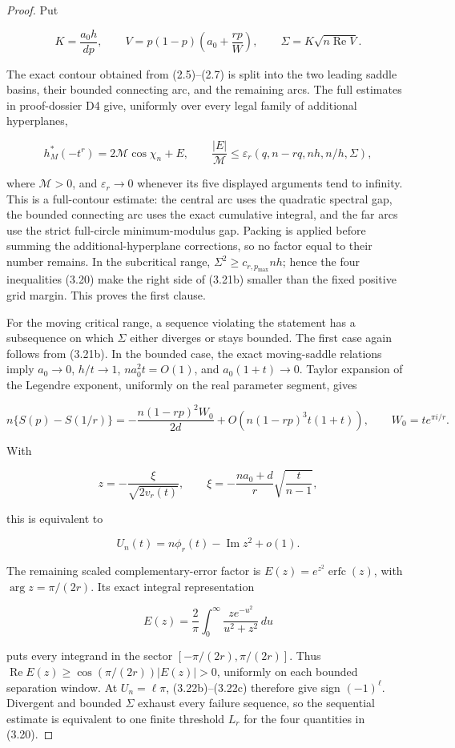 \documentclass[10pt]{article}
\begin{document}
\begin{proof}


Put

\[
 K=\frac{a_0h}{dp},\qquad
 V=p(1-p)\left(a_0+\frac{rp}{W}\right),
 \qquad \Sigma=K\sqrt{n\operatorname{Re}V}. \tag{3.21a}
\]

The exact contour obtained from (2.5)--(2.7) is split into the two leading
saddle basins, their bounded connecting arc, and the remaining arcs.  The
full estimates in proof-dossier D4 give, uniformly over every legal family of
additional hyperplanes,

\[
 h_M^*(-t^r)=2\mathcal M\cos\chi_n+E,\qquad
 \frac{|E|}{\mathcal M}\le
 \varepsilon_r(q,n-rq,nh,n/h,\Sigma), \tag{3.21b}
\]

where $\mathcal M>0$, and $\varepsilon_r\to0$ whenever its five displayed
arguments tend to infinity.  This is a full-contour estimate: the central arc
uses the quadratic spectral gap, the bounded connecting arc uses the exact
cumulative integral, and the far arcs use the strict full-circle minimum-modulus
gap.  Packing is applied before summing the additional-hyperplane corrections,
so no factor equal to their number remains.  In the subcritical range,
$\Sigma^2\ge c_{r,p_{\max}}nh$; hence the four inequalities (3.20) make
the right side of (3.21b) smaller than the fixed positive grid margin.  This
proves the first clause.

For the moving critical range, a sequence violating the statement has a
subsequence on which $\Sigma$ either diverges or stays bounded.  The first
case again follows from (3.21b).  In the bounded case, the exact moving-saddle
relations imply $a_0\to0$, $h/t\to1$,
$na_0^2t=O(1)$, and $a_0(1+t)\to0$.  Taylor expansion of the Legendre
exponent, uniformly on the real parameter segment, gives

\[
 n\{S(p)-S(1/r)\}
 =-\frac{n(1-rp)^2W_0}{2d}
  +O\!\left(n(1-rp)^3t(1+t)\right),
 \qquad W_0=t e^{\pi i/r}. \tag{3.22}
\]

With

\[
 z=-\frac{\xi}{\sqrt{2v_r(t)}},\qquad
 \xi=-\frac{na_0+d}{r}\sqrt{\frac{t}{n-1}}, \tag{3.22a}
\]

this is equivalent to

\[
 U_n(t)=n\phi_r(t)-\operatorname{Im}z^2+o(1). \tag{3.22b}
\]

The remaining scaled complementary-error factor is
$E(z)=e^{z^2}\operatorname{erfc}(z)$, with
$\arg z=\pi/(2r)$.  Its exact integral representation

\[
 E(z)=\frac2\pi\int_0^\infty
 \frac{z e^{-u^2}}{u^2+z^2}\,du \tag{3.22c}
\]

puts every integrand in the sector
$[ -\pi/(2r),\pi/(2r)]$.  Thus
$\operatorname{Re}E(z)\ge\cos(\pi/(2r))|E(z)|>0$, uniformly on each bounded
separation window.  At $U_n=\ell\pi$, (3.22b)--(3.22c) therefore give sign
$(-1)^\ell$.  Divergent and bounded $\Sigma$ exhaust every failure
sequence, so the sequential estimate is equivalent to one finite threshold
$L_r$ for the four quantities in (3.20).
\end{proof}
\end{document}
